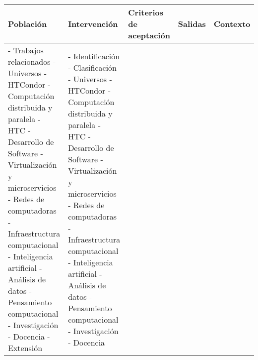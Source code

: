 \begin{table}[H]
	\centering
	\scriptsize
	\setlength{\tabcolsep}{2pt}
	\renewcommand{\arraystretch}{1.2}
	\fontsize{6}{10}\selectfont
	\begin{tabular}{|p{2.8cm}|p{2.8cm}|p{2.0cm}|p{2.8cm}|p{2.8cm}|} %
		\hline
		\textbf{Población}            & \textbf{Intervención} & \textbf{Criterios de aceptación} & \textbf{Salidas} & \textbf{Contexto} \\
		\hline
		- Trabajos relacionados \newline
		- Universos \newline
		- HTCondor \newline
		- Computación distribuida y paralela \newline
		- HTC \newline
		- Desarrollo de Software \newline
		- Virtualización y microservicios \newline
		- Redes de computadoras \newline
		- Infraestructura computacional \newline
		- Inteligencia artificial \newline
		- Análisis de datos \newline
		- Pensamiento computacional \newline
		- Investigación \newline
		- Docencia \newline
		- Extensión                   &
		- Identificación \newline
		- Clasificación \newline
		- Universos \newline
		- HTCondor \newline
		- Computación distribuida y paralela \newline
		- HTC \newline
		- Desarrollo de Software \newline
		- Virtualización y microservicios \newline
		- Redes de computadoras \newline
		- Infraestructura computacional \newline
		- Inteligencia artificial \newline
		- Análisis de datos \newline
		- Pensamiento computacional \newline
		- Investigación \newline
		- Docencia \newline

\end{tabular}
\end{table}
